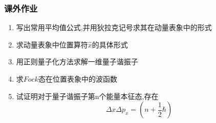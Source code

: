 \begin{frame}
    \frametitle{课外作业}
    \begin{enumerate}
        \item 写出常用平均值公式,并用狄拉克记号求其在动量表象中的形式
        \item 求动量表象中位置算符$\hat{x}$的具体形式
        \item 用正则量子化方法求解一维量子谐振子
        \item 求$Fock$态在位置表象中的波函数
        \item 试证明对于量子谐振子第n个能量本征态,存在 
                \[  \Delta x \Delta p_x = (n+\frac{1}{2}\hbar)   \]
    \end{enumerate}
\end{frame}
